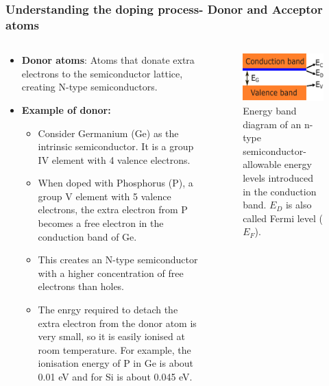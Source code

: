\begin{frame}
	\frametitle{Understanding the doping process- \textbf{Donor} and Acceptor atoms}
    \begin{columns}
        \begin{column}{0.65\textwidth}
    \begin{itemize}
        \item \textbf{Donor atoms}: Atoms that donate extra electrons to the semiconductor lattice, creating N-type semiconductors.
        \item \textbf{Example of donor:} 
        \begin{itemize}
            \item Consider Germanium (Ge) as the intrinsic semiconductor. It is a group IV element with 4 valence electrons.
            \item When doped with Phosphorus (P), a group V element with 5 valence electrons, the extra electron from P becomes a free electron in the conduction band of Ge.
            \item This creates an N-type semiconductor with a higher concentration of free electrons than holes.
            \item The enrgy required to detach the extra electron from the donor atom is very small, so it is easily ionised at room temperature. For example, the ionisation energy of P in Ge is about 0.01 eV and for Si is about 0.045 eV.
        \end{itemize}    
    \end{itemize}
        \end{column}
        \hfill
        \begin{column}{0.35\textwidth}
            \begin{figure}
                \centering
                \includegraphics[scale=1.5]{fig/lec02/donor.pdf}
                \caption{Energy band diagram of an n-type semiconductor- allowable energy levels introduced in the conduction band. $E_D$ is also called Fermi level ($E_F$).}
            \end{figure}
    \end{column}
        \end{columns}
\end{frame}


